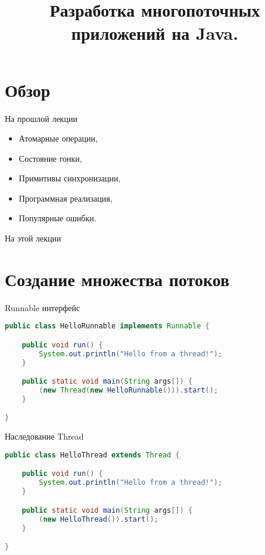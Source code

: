 

\title{Разработка многопоточных приложений на Java.}



\begin{frame}
\titlepage
\end{frame}

\section*{Обзор}

\begin{frame}{На прошлой лекции}
\begin{itemize}
    \item Атомарные операции,
    \item Состояние гонки,
    \item Примитивы синхронизации,
    \item Программная реализация,
    \item Популярные ошибки.
\end{itemize}
\end{frame}

\begin{frame}{На этой лекции}
\tableofcontents
\end{frame}

\section{Создание множества потоков}

\begin{frame}[fragile]{Runnable интерфейс}
\begin{lstlisting}[basicstyle=\footnotesize, language=Java]
public class HelloRunnable implements Runnable {

    public void run() {
        System.out.println("Hello from a thread!");
    }

    public static void main(String args[]) {
        (new Thread(new HelloRunnable())).start();
    }

}
\end{lstlisting}
\end{frame}

\begin{frame}[fragile]{Наследование Thread}
\begin{lstlisting}[basicstyle=\footnotesize, language=Java]
public class HelloThread extends Thread {

    public void run() {
        System.out.println("Hello from a thread!");
    }

    public static void main(String args[]) {
        (new HelloThread()).start();
    }

}
\end{lstlisting}
\end{frame}


